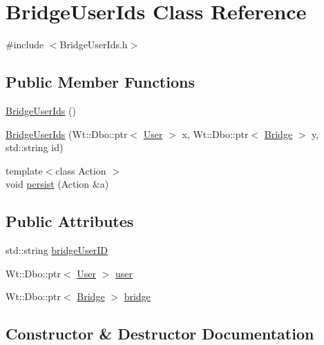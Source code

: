 \hypertarget{class_bridge_user_ids}{}\section{Bridge\+User\+Ids Class Reference}
\label{class_bridge_user_ids}


{\ttfamily \#include $<$Bridge\+User\+Ids.\+h$>$}

\subsection*{Public Member Functions}
\begin{DoxyCompactItemize}
\item 
\hyperlink{class_bridge_user_ids_ae94821f5d146bac39480c9d4c51833b9}{Bridge\+User\+Ids} ()
\item 
\hyperlink{class_bridge_user_ids_ae493577d89b03fa58a2218ec0eee466b}{Bridge\+User\+Ids} (Wt\+::\+Dbo\+::ptr$<$ \hyperlink{class_user}{User} $>$ x, Wt\+::\+Dbo\+::ptr$<$ \hyperlink{class_bridge}{Bridge} $>$ y, std\+::string id)
\item 
{\footnotesize template$<$class Action $>$ }\\void \hyperlink{class_bridge_user_ids_a8b4bf329ea12c999cca1775ef9d981cc}{persist} (Action \&a)
\end{DoxyCompactItemize}
\subsection*{Public Attributes}
\begin{DoxyCompactItemize}
\item 
std\+::string \hyperlink{class_bridge_user_ids_ae44d7688638178ed7ba299ca9687cbb5}{bridge\+User\+ID}
\item 
Wt\+::\+Dbo\+::ptr$<$ \hyperlink{class_user}{User} $>$ \hyperlink{class_bridge_user_ids_ab8cf148abfa077eb56c62576386dcffc}{user}
\item 
Wt\+::\+Dbo\+::ptr$<$ \hyperlink{class_bridge}{Bridge} $>$ \hyperlink{class_bridge_user_ids_acc206990c5f8a7faa8aa5d90c202b31a}{bridge}
\end{DoxyCompactItemize}


\subsection{Constructor \& Destructor Documentation}
\mbox{\label{class_bridge_user_ids_ae94821f5d146bac39480c9d4c51833b9}} 
